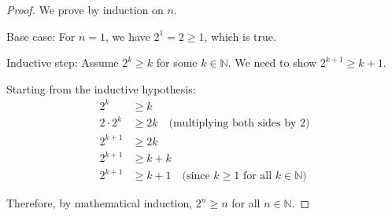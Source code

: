\documentclass[12pt]{article}
\newcommand{\NN}{\ensuremath{\mathbb N}}
\begin{document}
\begin{proof}
	We prove by induction on $n$.

Base case: For $n = 1$, we have $2^1 = 2 \ge 1$, which is true.

Inductive step: Assume $2^k \ge k$ for some $k \in \NN$. We need to show $2^{k+1} \ge k + 1$.

Starting from the inductive hypothesis:
\begin{align*}
2^k &\ge k \\
2 \cdot 2^k &\ge 2k \quad \text{(multiplying both sides by 2)} \\
2^{k+1} &\ge 2k \\
2^{k+1} &\ge k + k \\
2^{k+1} &\ge k + 1 \quad \text{(since $k \ge 1$ for all $k \in \NN$)}
\end{align*}

Therefore, by mathematical induction, $2^n \ge n$ for all $n \in \NN$.
\end{proof}
\end{document}
